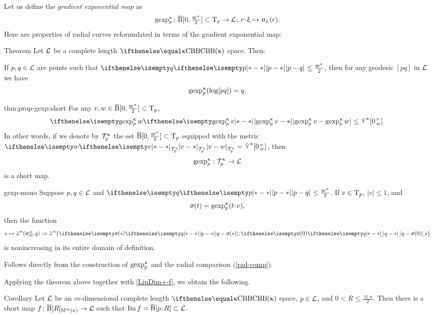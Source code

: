 Let us define the \emph{gradient exponential map} as 
\[
\gexp\mc\kappa_p\:\cBall[\0,\tfrac{\varpi\kappa}2]\subset \T_p\to \spc{L} \: r\cdot\xi\mapsto\sigma_\xi(r).
\]
Here are properties of radial curves reformulated in terms of the gradient exponential map:

\begin{thm}{Theorem}\label{thm:prop-gexp}
Let $\mathcal{L}$ be a complete length $\Alex{\kappa}$ space. 
Then:
\begin{subthm}{}
If $p,q\in \spc{L}$ are points such that $\dist{p}{q}{}\le\tfrac{\varpi\kappa}2$, then for any geodesic $[pq]$ in $\mathcal{L}$ we have
\[\mathop{\rm gexp}\nolimits^{\upkappa}_p(\mathrm{log}[{p}{q}])=q.\] 
\end{subthm}

\begin{subthm}{thm:prop-gexp:short} 
For any $v,w\in \cBall[\0,\tfrac{\varpi\kappa}2]\subset \T_p$,
\[\dist{\gexp\mc\kappa_p v}{\gexp\mc\kappa_p w}{}
\le
\side\kappa\hinge{\0}v w.\]
In other words, if we denote by $\mathcal{T}_{p}^{\upkappa}$ the set $\cBall[\0,\tfrac{\varpi\kappa}2]\subset \T_p$ 
equipped with the metric $\dist{v}{w}{\mathcal{T}\mc\kappa_{p}}=\side\kappa\hinge{\0}v w$, 
then 
\[\gexp\mc\kappa_p:\mathcal{T}\mc\kappa_{p}\to \spc{L}\] 
is a short map.
\end{subthm}

\begin{subthm}{gexp-mono} 
Suppose
$p, q\in \spc{L}$ 
and $\dist{p}{q}{}\le \tfrac{\varpi\kappa}2$.
If $v\in\T_p$, $|v|\le 1$, and 
\[\sigma(t)=\gexp\mc\kappa_p(t\cdot v),\]
then the function
\[
s
\mapsto 
\tangle\mc\kappa(\sigma|_0^s,q)
\df
\tangle\mc\kappa\{\dist{q}{\sigma(s)}{};\dist{q}{\sigma(0)},s\}
\]
is nonincreasing in its entire domain of definition.
\end{subthm}
\end{thm}

Follows directly from the construction of $\mathop{\rm gexp}\nolimits^{\upkappa}_p$ and the radial comparison (\ref{rad-comp}).
\qeds

Applying the theorem above together with \ref{LinDim+-f},
we obtain the following.

{\sloppy 
 
\begin{thm}{Corollary}\label{cor:short-map-to-ball}
Let $\mathcal{L}$ be an $m$-dimensional complete length $\Alex\kappa$ space, $p\in\spc{L}$, and $0<R\le\tfrac{\varpi\kappa}2$.
Then there is a short map 
$f\:\cBall[R]_{\Lob{m}{\kappa}}\to \spc{L}$
such that $\Im f= \cBall[p,R]\subset \spc{L}$.
\end{thm}

}





